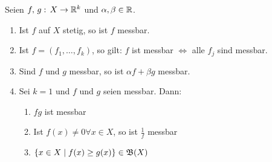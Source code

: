 \documentclass[a4paper,twoside,DIV15,BCOR12mm,chapterprefix=true,headings=onelinechapter]{scrbook}
\begin{document}
\begin{satz}
\label{Satz 3.2}
Seien \(f,\,g:\,X\to\mathbb{R}^{k}\) und \(\alpha,\beta\in\mathbb{R}\).
\begin{enumerate}
\item Ist \(f\) auf \(X\) stetig, so ist \(f\) messbar.
\item Ist \(f=(f_{1},\ldots,f_{k})\), so gilt: \(f\) ist messbar \(\Leftrightarrow\) alle \(f_{j}\) sind messbar.
\item Sind \(f\) und \(g\) messbar, so ist \(\alpha f+\beta g\) messbar.
\item Sei \(k=1\) und \(f\) und \(g\) seien messbar. Dann:
\begin{enumerate}
\item \(fg\) ist messbar
\item Ist \(f(x)\neq0\forall x\in X\), so ist \(\frac{1}{f}\) messbar
\item \(\{x\in X\mid f(x)\geq g(x)\}\in\mathfrak{B}(X)\)
\end{enumerate}
\end{enumerate}
\end{satz}
\end{document}
